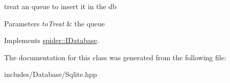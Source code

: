 treat an queue to insert it in the db 


\begin{DoxyParams}{Parameters}
{\em to\+Treat} & the queue \\
\hline
\end{DoxyParams}


Implements \hyperlink{classspider_1_1_i_database_ad5f4a8f7bd0936833d50c126f203a7c5}{spider\+::\+I\+Database}.



The documentation for this class was generated from the following file\+:\begin{DoxyCompactItemize}
\item 
includes/\+Database/Sqlite.\+hpp\end{DoxyCompactItemize}
